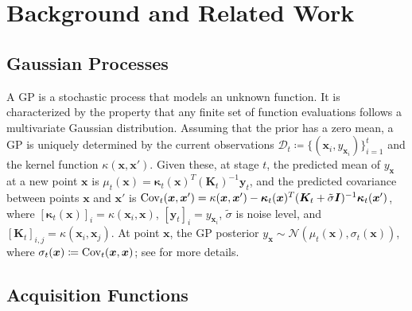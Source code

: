 \documentclass[accepted]{uai2025}
\begin{document}
\section{Background and Related Work}
\label{sec:related-work}
\subsection{Gaussian Processes}
A \ac{GP} is a stochastic process that models an unknown function. 
It is characterized by the property that any finite set of function evaluations follows a multivariate Gaussian distribution. 
Assuming that the prior has a zero mean, a \ac{GP} is uniquely determined by the current observations $\mathcal{D}_t\coloneqq\{(\bm x_i, y_{\bm x_i})\}_{i=1}^t$ and the kernel function $\kappa(\bm x, \bm x')$. 
Given these, at stage $t$, the predicted mean of $y_{\bm{x}}$ at a new point $\bm x$ is $\mu_t(\bm x) = \bm\kappa_t(\bm x)^T (\bm K_t)^{-1} \bm y_t$, and the predicted covariance between points $\bm x$ and $\bm x'$ is $\textup{Cov}_t(\bm x, \bm x') = \kappa(\bm x, \bm x') - \bm\kappa_t(\bm x)^T (\bm K_t+\tilde{\sigma}\bm I)^{-1} \bm\kappa_t(\bm x')$,
where $[\bm\kappa_t(\bm x)]_i = \kappa(\bm x_i, \bm x)$, $[\bm y_t]_i = y_{\bm x_i}$, $\tilde{\sigma}$ is noise level, and $[\bm K_t]_{i, j} = \kappa(\bm x_i, \bm x_j)$. At point $\bm x$, the \ac{GP} posterior $y_{\bm x}\sim\mathcal{N}(\mu_t(\bm x), \sigma_t(\bm x))$, where $\sigma_t(\bm x)\coloneqq \textup{Cov}_t(\bm x, \bm x)$; see \citet{rasmussen2006gaussian} for more details. 


\subsection{Acquisition Functions}
\end{document}
